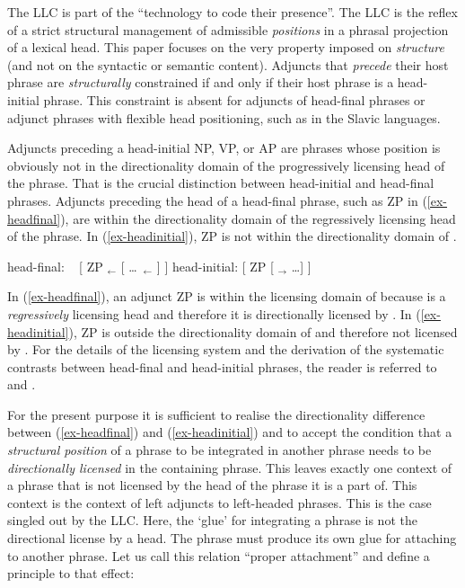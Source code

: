 \documentclass[output=paper
  ,nobabel
  ,uniformtopskip %
]{langscibook}
\begin{document}
The LLC is part of the ``technology to code their presence''. The LLC is the reflex of a strict structural management of admissible \emph{positions} in a phrasal projection of a lexical head. This paper focuses on the very property imposed on \emph{structure} (and not on the syntactic or semantic content). Adjuncts that \emph{precede} their host phrase are \emph{structurally} constrained if and only if their host phrase is a head-initial phrase. This constraint is absent for adjuncts of head-final phrases or adjunct phrases with flexible head positioning, such as in the Slavic languages.

Adjuncts preceding a head-initial NP, VP, or AP are phrases whose position is obviously not in the directionality domain of the progressively licensing head of the phrase. That is the crucial distinction between head-initial and head-final phrases. Adjuncts preceding the head of a head-final phrase, such as ZP in (\ref{ex-headfinal}), are within the directionality domain of the regressively licensing head of the phrase. In (\ref{ex-headinitial}), ZP is not within the directionality domain of \xzero.

\eal
\ex\label{ex-headfinal}  head-final: ~ [ ZP $_\leftarrow$ [ \ldots\ $_\leftarrow$ \xzero] ]
\ex\label{ex-headinitial} head-initial:	[ ZP [ \xzero $_\rightarrow$ \ldots ] ]
\zl

\noindent
In (\ref{ex-headfinal}), an adjunct ZP is within the licensing domain of \xzero because \xzero is a \emph{regressively} licensing head and therefore it is directionally licensed by \xzero. In (\ref{ex-headinitial}), ZP is outside the directionality domain of \xzero and therefore not licensed by \xzero. For the details of the licensing system and the derivation of the systematic contrasts between head-final and head-initial phrases, the reader is referred to \citet{Haider2015} and \citet{Haider2020a}.

\largerpage
For the present purpose it is sufficient to realise the directionality difference between (\ref{ex-headfinal}) and (\ref{ex-headinitial}) and to accept the condition that a \emph{structural position} of a phrase to be integrated in another phrase needs to be \emph{directionally licensed} in the containing phrase. This leaves exactly one context of a phrase that is not licensed by the head of the phrase it is a part of. This context is the context of left adjuncts to left-headed phrases. This is the case singled out by the LLC. Here, the `glue' for integrating a phrase is not the directional license by a head. The phrase must produce its own glue for attaching to another phrase. Let us call this relation ``proper attachment'' and define a principle to that effect:
\end{document}
